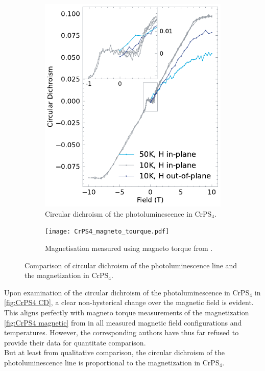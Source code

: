 \documentclass[
	oneside,
	parskip=half,
	a4paper,
]{scrbook}
\begin{document}
\begin{figure}
	\begin{subfigure}[t]{3.5in}
		\includegraphics{../figures/2023-12-14 CrPS4 circular dichroism.pdf}
		\caption{Circular dichroism of the photoluminescence in CrPS$_4$.}
		\label{fig:CrPS4 CD}
	\end{subfigure}
	\begin{subfigure}[t]{2.5in}
		\texttt{[image: CrPS4\_magneto\_tourque.pdf]}
		\caption{Magnetisation measured using magneto torque from \cite{CrPS4_magnetic}.}
		\label{fig:CrPS4 magnetic}
	\end{subfigure}
	\caption{Comparison of circular dichroism of the photoluminescence line and the magnetization in CrPS$_4$.}
\end{figure}
Upon examination of the circular dichroism of the photoluminescence in CrPS$_4$ in \autoref{fig:CrPS4 CD},
a clear non-hysterical change over the magnetic field is evident.\\
This aligns perfectly with magneto torque measurements of the magnetization \autoref{fig:CrPS4 magnetic} from \cite{CrPS4_magnetic} in all measured magnetic field configurations and temperatures.
However, the corresponding authors have thus far refused to provide their data for quantitate comparison.\\
But at least from qualitative comparison, the circular dichroism of the photoluminescence line is proportional to the magnetization in CrPS$_4$. 
\end{document}
